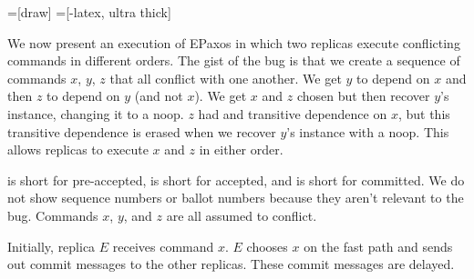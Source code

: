 \documentclass{mwhittaker}
\begin{document}
=[draw]
=[-latex, ultra thick]

We now present an execution of EPaxos in which two replicas execute conflicting
commands in different orders. The gist of the bug is that we create a sequence
of commands $x$, $y$, $z$ that all conflict with one another. We get $y$ to
depend on $x$ and then $z$ to depend on $y$ (and not $x$). We get $x$ and $z$
chosen but then recover $y$'s instance, changing it to a noop. $z$ had and
transitive dependence on $x$, but this transitive dependence is erased when we
recover $y$'s instance with a noop. This allows replicas to execute $x$ and $z$
in either order.

\preaccepted{} is short for pre-accepted, \accepted{} is short for accepted,
and \committed{} is short for committed. We do not show sequence numbers or
ballot numbers because they aren't relevant to the bug. Commands $x$, $y$, and
$z$ are all assumed to conflict.

Initially, replica $E$ receives command $x$. $E$ chooses $x$ on the fast path
and sends out commit messages to the other replicas. These commit messages are
delayed.
\begin{center}
\end{center}
\end{document}
